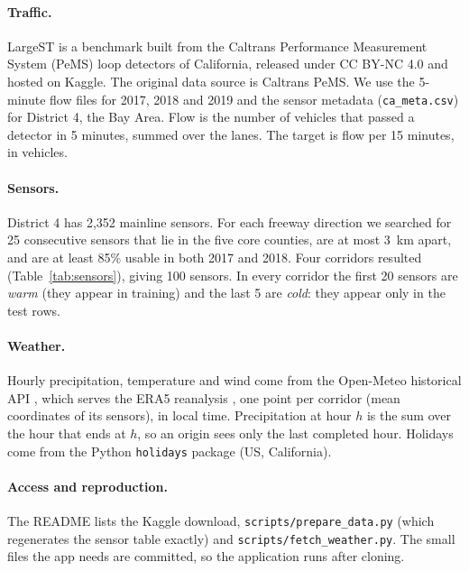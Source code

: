 \documentclass[11pt,a4paper]{article}
\newcommand{\code}[1]{\texttt{#1}}
\begin{document}
\paragraph{Traffic.} LargeST \cite{largest} is a benchmark built from the Caltrans Performance Measurement System (PeMS) \cite{pems}
loop detectors of California, released under CC BY-NC 4.0 and hosted on Kaggle. The original data source is Caltrans PeMS. We use the
5-minute flow files for 2017, 2018 and 2019 and the sensor metadata (\code{ca\_meta.csv}) for District 4, the Bay Area. Flow is the number
of vehicles that passed a detector in 5 minutes, summed over the lanes. The target is flow per 15 minutes, in vehicles.

\paragraph{Sensors.} District 4 has 2{,}352 mainline sensors. For each freeway direction we searched for 25 consecutive sensors that lie in the five core
counties, are at most 3~km apart, and are at least 85\% usable in both 2017 and 2018. Four corridors resulted (Table~\ref{tab:sensors}), giving 100 sensors.
In every corridor the first 20 sensors are \emph{warm} (they appear in training) and the last 5 are \emph{cold}: they appear only in the test rows.

\begin{table}[H]\centering\small

\caption{The four corridors (25 sensors each). ``Min.\ usable'' is the lowest share of readings that are present and not a daytime zero, over the corridor's sensors and 2017--2018.}\label{tab:sensors}
\end{table}

\paragraph{Weather.} Hourly precipitation, temperature and wind come from the Open-Meteo historical API \cite{openmeteo}, which serves the ERA5 reanalysis \cite{era5}, one point per corridor
(mean coordinates of its sensors), in local time. Precipitation at hour $h$ is the sum over the hour that ends at $h$, so an origin sees only the last completed hour.
Holidays come from the Python \code{holidays} package (US, California).

\paragraph{Access and reproduction.} The README lists the Kaggle download, \code{scripts/prepare\_data.py} (which regenerates the sensor table exactly) and
\code{scripts/fetch\_weather.py}. The small files the app needs are committed, so the application runs after cloning.
\end{document}
